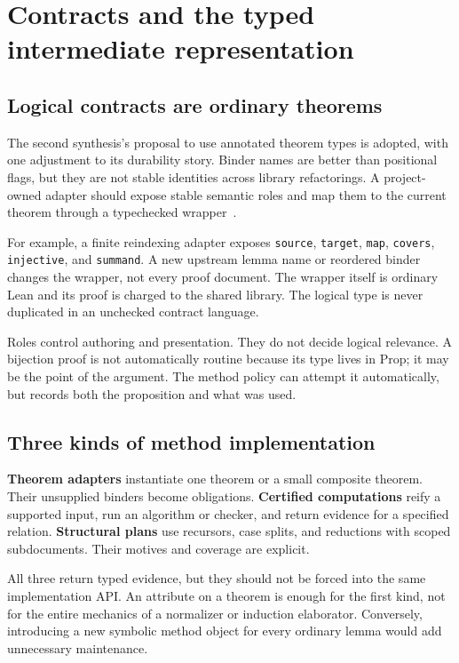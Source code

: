\documentclass[11pt,a4paper]{article}
\newcommand{\code}[1]{\nolinkurl{#1}}
\theoremstyle{definition}
\begin{document}
\section{Contracts and the typed intermediate representation}\label{sec:contracts}
\subsection{Logical contracts are ordinary theorems}
The second synthesis's proposal to use annotated theorem types is adopted, with
one adjustment to its durability story. Binder names are better than positional
flags, but they are not stable identities across library refactorings. A
project-owned adapter should expose stable semantic roles and map them to the
current theorem through a typechecked wrapper~\cite{blueprints,synthesis}.

For example, a finite reindexing adapter exposes \code{source}, \code{target},
\code{map}, \code{covers}, \code{injective}, and \code{summand}. A new upstream
lemma name or reordered binder changes the wrapper, not every proof document.
The wrapper itself is ordinary Lean and its proof is charged to the shared
library. The logical type is never duplicated in an unchecked contract language.

Roles control authoring and presentation. They do not decide logical relevance.
A bijection proof is not automatically routine because its type lives in
\(\mathrm{Prop}\); it may be the point of the argument. The method policy can
attempt it automatically, but records both the proposition and what was used.

\subsection{Three kinds of method implementation}
\textbf{Theorem adapters} instantiate one theorem or a small composite theorem.
Their unsupplied binders become obligations. \textbf{Certified computations}
reify a supported input, run an algorithm or checker, and return evidence for a
specified relation. \textbf{Structural plans} use recursors, case splits, and
reductions with scoped subdocuments. Their motives and coverage are explicit.

All three return typed evidence, but they should not be forced into the same
implementation API. An attribute on a theorem is enough for the first kind, not
for the entire mechanics of a normalizer or induction elaborator. Conversely,
introducing a new symbolic method object for every ordinary lemma would add
unnecessary maintenance.
\end{document}
